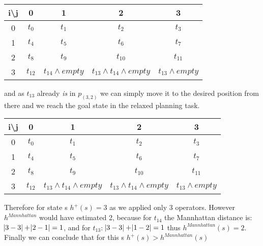 \documentclass[12pt,a4paper]{article}
\begin{document}
\begin{enumerate}[label=(\alph*), listparindent=1.5em]
		\begin{center}
			\begin{tabular}{c||c|c|c|c|}
				 i\textbackslash j & 0 & 1 & 2 & 3\\
				\hline\hline
				0 & $t_0$ & $t_1$ & $t_2$ & $t_3$ \\
				\hline
				1 & $t_4$ & $t_5$ & $t_6$ & $t_7$ \\
				\hline
				2 & $t_8$ & $t_9$ & $t_{10}$ & $t_{11}$ \\
				\hline
				3 & $t_{12}$ & $t_{14} \land empty$ & $t_{13} \land t_{14} \land empty$ &  $t_{13} \land empty $ \\
				\hline
			\end{tabular}
		\end{center}
		
		and as $t_{13}$ already \emph{is} in $p_{(3,2)}$ we can
		simply move it to the desired position from there and
		we reach the goal state in the relaxed planning task.
		\begin{center}
			\begin{tabular}{c||c|c|c|c|}
				 i\textbackslash j & 0 & 1 & 2 & 3\\
				\hline\hline
				0 & $t_0$ & $t_1$ & $t_2$ & $t_3$ \\
				\hline
				1 & $t_4$ & $t_5$ & $t_6$ & $t_7$ \\
				\hline
				2 & $t_8$ & $t_9$ & $t_{10}$ & $t_{11}$ \\
				\hline
				3 & $t_{12}$ & $t_{13} \land t_{14} \land empty $ & $t_{13} \land t_{14} \land empty$ &  $t_{13} \land empty $ \\
				\hline
			\end{tabular}
		\end{center}

		Therefore for state s $h^+(s)=3$ as we applied only 3 operators.
		However $h^{Mannhattan}$ would have estimated 2, because for 
		$t_{14}$ the Mannhattan distance is: $\abs{3-3} + \abs{2-1}=1$,
		and for $t_{13}$: $\abs{3-3} + \abs{1-2}=1$ thus $h^{Mannhattan}(s)=2$. 
		Finally we can conclude that for this s $h^+(s) > h^{Mannhattan}(s)$
	\end{enumerate}
\end{document}
